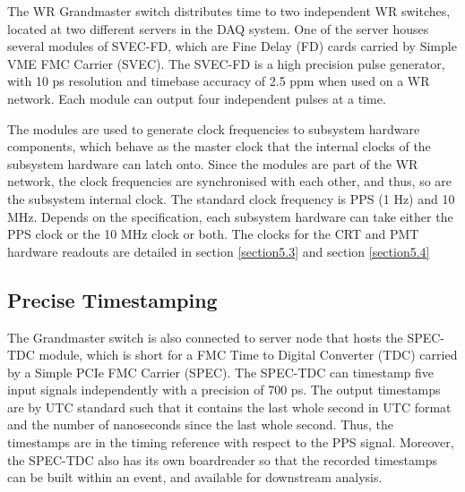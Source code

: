 The WR Grandmaster switch distributes time to two independent WR switches, located at two different servers in the DAQ system.
One of the server houses several modules of SVEC-FD, which are Fine Delay (FD) cards carried by Simple VME FMC Carrier (SVEC).
The SVEC-FD is a high precision pulse generator, with 10 ps resolution and timebase accuracy of 2.5 ppm when used on a WR network.
Each module can output four independent pulses at a time.

The modules are used to generate clock frequencies to subsystem hardware components, which behave as the master clock that the internal clocks of the subsystem hardware can latch onto.
Since the modules are part of the WR network, the clock frequencies are synchronised with each other, and thus, so are the subsystem internal clock.
The standard clock frequency is PPS (1 Hz) and 10 MHz. 
Depends on the specification, each subsystem hardware can take either the PPS clock or the 10 MHz clock or both. The clocks for the CRT and PMT hardware readouts are detailed in section \ref{section5.3} and section \ref{section5.4}

\subsection{Precise Timestamping}
\label{section5.2.2}

The Grandmaster switch is also connected to server node that hosts the SPEC-TDC module, which is short for a FMC Time to Digital Converter (TDC) carried by a Simple PCIe FMC Carrier (SPEC).
The SPEC-TDC can timestamp five input signals independently with a precision of 700 ps.
The output timestamps are by UTC standard such that it contains the last whole second in UTC format and the number of nanoseconds since the last whole second.
Thus, the timestamps are in the timing reference with respect to the PPS signal.
Moreover, the SPEC-TDC also has its own boardreader so that the recorded timestamps can be built within an event, and available for downstream analysis.

